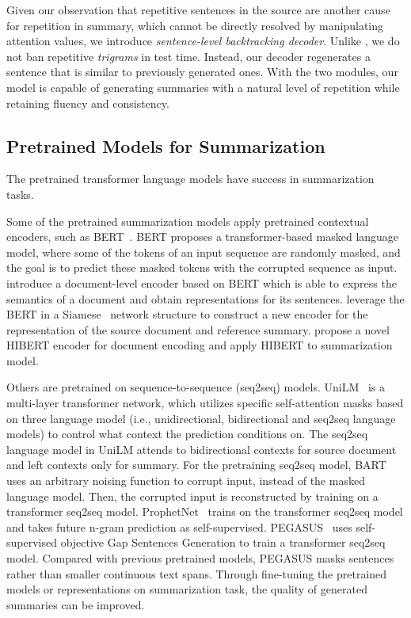Given our observation that repetitive sentences in the source are
another cause for repetition in summary, 
which cannot be directly resolved by manipulating attention values, 
we introduce \textit{sentence-level backtracking decoder}. 
Unlike \cite{PaulusXS17}, 
we do not ban repetitive \textit{trigrams} in test time. 
Instead, our decoder regenerates a sentence that is similar to previously generated ones.
With the two modules, our model is capable of generating summaries with a
natural level of repetition while retaining fluency and consistency.

\subsection{Pretrained Models for Summarization}
The pretrained transformer language models have success in summarization tasks.

Some of the pretrained summarization models apply pretrained contextual encoders, such as BERT~\citep{Bert19}.
BERT proposes a transformer-based masked language model, where some of the tokens of an input sequence are randomly masked, and the goal is to predict these masked tokens with
the corrupted sequence as input. 
\cite{LiuL19} introduce a document-level encoder based on
BERT which is able to express the semantics
of a document and obtain representations for
its sentences.
\cite{ZhongLCWQH20} leverage the BERT in a Siamese~\citep{Siamese93} network structure to
construct a new encoder for the representation of the source document and reference summary.
\cite{HiBert19} propose a novel HIBERT encoder for document encoding
and apply HIBERT to summarization model.

Others are pretrained on sequence-to-sequence (seq2seq) models.
UniLM~\citep{UniLM19} is a multi-layer transformer network,
which utilizes specific self-attention masks based on three language model (i.e., unidirectional, bidirectional and seq2seq language models)
 to control what context the prediction conditions on. 
The seq2seq language model in UniLM attends to bidirectional contexts for source document and left contexts only
for summary.
For the pretraining seq2seq model, BART~\citep{BART19} uses an arbitrary noising function to corrupt input,
instead of the masked language model. Then, the
corrupted input is reconstructed by training on a transformer seq2seq model.
ProphetNet~\citep{ProNet20} trains on the transformer seq2seq model and 
takes future n-gram prediction as self-supervised.
PEGASUS~\citep{PEGASUS20} uses self-supervised objective Gap Sentences Generation to train 
a transformer seq2seq model. Compared with previous pretrained models, 
PEGASUS masks sentences rather than smaller continuous text spans.
Through fine-tuning the pretrained models or representations on summarization task,
the quality of generated summaries can be improved.

